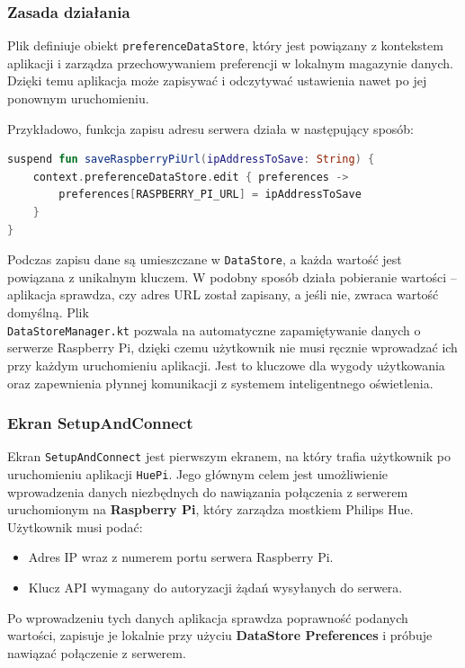 \documentclass[12pt]{article}
\begin{document}
\subsubsection*{Zasada działania}
Plik definiuje obiekt \texttt{preferenceDataStore}, który jest powiązany z kontekstem aplikacji i zarządza przechowywaniem preferencji w lokalnym magazynie danych. Dzięki temu aplikacja może zapisywać
i odczytywać ustawienia nawet po jej ponownym uruchomieniu.

Przykładowo, funkcja zapisu adresu serwera działa w następujący sposób:

\begin{lstlisting}[language=Kotlin]
suspend fun saveRaspberryPiUrl(ipAddressToSave: String) {
    context.preferenceDataStore.edit { preferences ->
        preferences[RASPBERRY_PI_URL] = ipAddressToSave
    }
}
\end{lstlisting}
Podczas zapisu dane są umieszczane w \texttt{DataStore}, a każda wartość jest powiązana z unikalnym kluczem. W podobny sposób działa pobieranie wartości – aplikacja sprawdza, czy adres URL
został zapisany, a jeśli nie, zwraca wartość domyślną. Plik \\\texttt{DataStoreManager.kt} pozwala na automatyczne zapamiętywanie danych o serwerze Raspberry Pi, dzięki czemu użytkownik nie musi
ręcznie wprowadzać ich przy każdym uruchomieniu aplikacji. Jest to kluczowe dla wygody użytkowania oraz zapewnienia płynnej komunikacji z systemem inteligentnego oświetlenia.



\subsubsection{Ekran SetupAndConnect}
Ekran \texttt{SetupAndConnect} jest pierwszym ekranem, na który trafia użytkownik po uruchomieniu aplikacji \texttt{HuePi}. Jego głównym celem jest umożliwienie wprowadzenia danych niezbędnych
do nawiązania połączenia z serwerem uruchomionym na \textbf{Raspberry Pi}, który zarządza mostkiem Philips Hue. Użytkownik musi podać:
\begin{itemize}
    \item Adres IP wraz z numerem portu serwera Raspberry Pi.
    \item Klucz API wymagany do autoryzacji żądań wysyłanych do serwera.
\end{itemize}
Po wprowadzeniu tych danych aplikacja sprawdza poprawność podanych wartości, zapisuje je lokalnie przy użyciu \textbf{DataStore Preferences} i próbuje nawiązać połączenie z serwerem.
\end{document}
